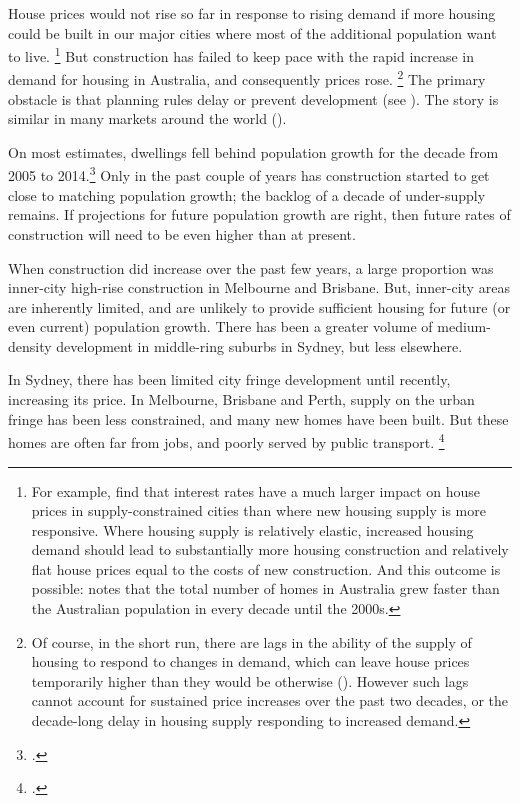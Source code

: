 House prices would not rise so far in response to rising demand if more housing could be built in our major cities where most of the additional population want to live.%
    \footnote{For example, \textcite[][325]{Glaeser-Gyourko-Can-Cheap-Credit-Explain-the-Housing-Boom} find that interest rates have a much larger impact on house prices in supply-constrained cities than where new housing supply is more responsive.
    Where housing supply is relatively elastic, increased housing demand should lead to substantially more housing construction and relatively flat house prices equal to the costs of new construction.
    And this outcome is possible: \textcite{Eslake2013} notes that the total number of homes in Australia grew faster than the Australian population in every decade until the 2000s.}
But construction has failed to keep pace with the rapid increase in demand for housing in Australia, and consequently prices rose.%
    \footnote{Of course, in the short run, there are lags in the ability of the supply of housing to respond to changes in demand, which can leave house prices temporarily higher than they would be otherwise (\textcite[][26]{KohlerandvanderMerwe}). However such lags cannot account for sustained price increases over the past two decades, or the decade-long delay in housing supply responding to increased demand.}
The primary obstacle is that planning rules delay or prevent development (see ).
The story is similar in many markets around the world ().



On most estimates, dwellings fell behind population growth for the decade from 2005 to 2014.\footcites{KohlerandvanderMerwe}{Gradwell2017HousingBalance}
Only in the past couple of years has construction started to get close to matching population growth; the backlog of a decade of under-supply remains.
If projections for future population growth are right, then future rates of construction will need to be even higher than at present.

When construction did increase over the past few years, a large proportion was inner-city high-rise construction in Melbourne and Brisbane.
But, inner-city areas are inherently limited, and are unlikely to provide sufficient housing for future (or even current) population growth. There has been a greater volume of medium-density development in middle-ring suburbs in Sydney, but less elsewhere.

In Sydney, there has been limited city fringe development until recently, increasing its price.
In Melbourne, Brisbane and Perth, supply on the urban fringe has been less constrained, and many new homes have been built.
But these homes are often far from jobs, and poorly served by public transport.%
    \footcites{NBER2017HsiehMoretti}{Parkhomenko2016}{Herkenhoff2017EmpireStates}

